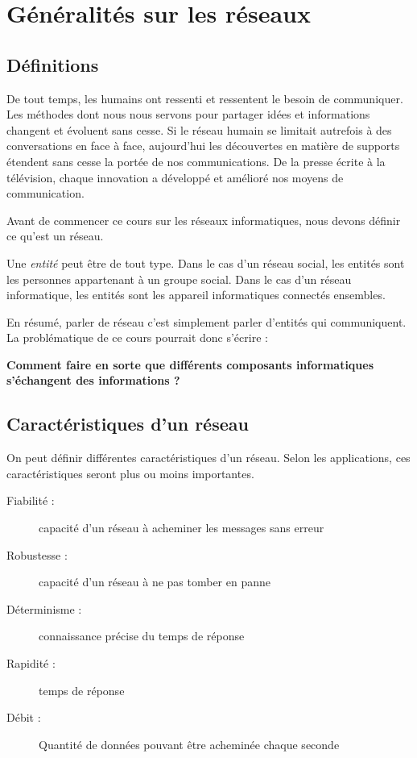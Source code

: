 \section{Généralités sur les réseaux}
\subsection{Définitions}

De tout temps, les humains ont ressenti et ressentent le besoin de communiquer.
Les méthodes dont nous nous servons pour partager idées et informations changent et évoluent sans cesse. Si le réseau humain se limitait autrefois à des conversations en face à face, aujourd'hui les découvertes en matière de supports étendent sans cesse la portée de nos communications. De la presse écrite à la télévision, chaque innovation a développé et amélioré nos moyens de communication.

Avant de commencer ce cours sur les réseaux informatiques, nous devons définir ce qu'est un réseau.

Une \textit{entité} peut être de tout type. Dans le cas d'un réseau social, les entités sont les personnes appartenant à un groupe social. Dans le cas d'un réseau informatique, les entités sont les appareil informatiques connectés ensembles.

En résumé, parler de réseau c'est simplement parler d'entités qui communiquent. La problématique de ce cours pourrait donc s'écrire :

\textbf{Comment faire en sorte que différents composants informatiques s'échangent des informations ? }



\subsection{Caractéristiques d'un réseau}
On peut définir différentes caractéristiques d'un réseau. Selon les applications, ces caractéristiques seront plus ou moins importantes.
\begin{description}
  \item [Fiabilité : ] capacité d'un réseau à acheminer les messages sans erreur
  \item [Robustesse : ] capacité d'un réseau à ne pas tomber en panne
  \item [Déterminisme : ] connaissance précise du temps de réponse
  \item [Rapidité : ] temps de réponse
  \item [Débit : ] Quantité de données pouvant être acheminée chaque seconde
\end{description}

